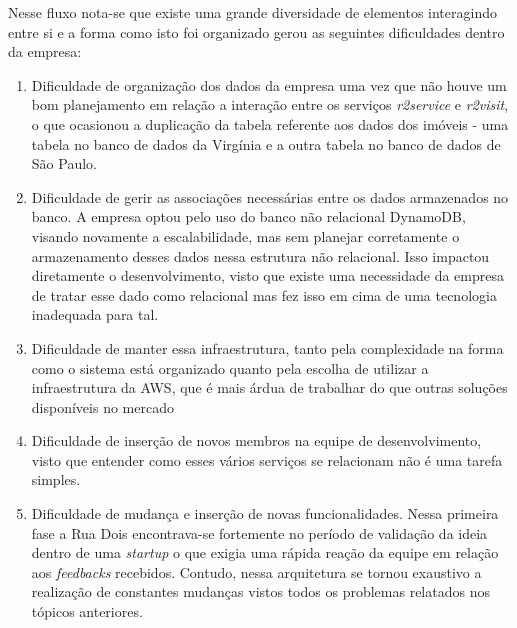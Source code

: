 Nesse fluxo nota-se que existe uma grande diversidade de elementos interagindo entre
si e a forma como isto foi organizado gerou as seguintes dificuldades dentro da empresa:

    \begin{enumerate}
        \item{Dificuldade de organização dos dados da empresa uma vez que não houve
        um bom planejamento em relação a interação entre os serviços \textit{r2service}
        e \textit{r2visit}, o que ocasionou a duplicação da tabela referente aos dados
        dos imóveis - uma tabela no banco de dados da Virgínia e a outra tabela no banco
        de dados de São Paulo.}
        \item{Dificuldade de gerir as associações necessárias entre os dados armazenados
        no banco. A empresa optou pelo uso do banco não relacional DynamoDB, visando
        novamente a escalabilidade, mas sem planejar corretamente o armazenamento desses
        dados nessa estrutura não relacional. Isso impactou diretamente o desenvolvimento,
        visto que existe uma necessidade da empresa de tratar esse dado como relacional
        mas fez isso em cima de uma tecnologia inadequada para tal.}
        \item{Dificuldade de manter essa infraestrutura, tanto pela complexidade na forma
        como o sistema está organizado quanto pela escolha de utilizar a infraestrutura da
        \gls{AWS}, que é mais árdua de trabalhar do que outras soluções disponíveis no mercado
        \cite{kavya}}
        \item{Dificuldade de inserção de novos membros na equipe de desenvolvimento, visto
        que entender como esses vários serviços se relacionam não é uma tarefa simples.}
        \item{Dificuldade de mudança e inserção de novas funcionalidades. Nessa primeira
        fase a Rua Dois encontrava-se fortemente no período de validação da ideia dentro
        de uma \textit{startup} o que exigia uma rápida reação da equipe em relação aos
        \textit{feedbacks} recebidos. Contudo, nessa arquitetura se tornou exaustivo a
        realização de constantes mudanças vistos todos os problemas relatados nos tópicos
        anteriores.}
    \end{enumerate}

